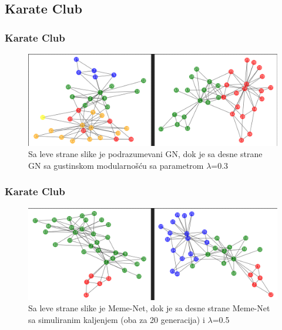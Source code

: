 \documentclass{beamer}
\begin{document}
\subsection{Karate Club}
\begin{frame}\frametitle{Karate Club}
\begin{figure}[h!]
\begin{center}
\includegraphics[scale=0.21]{Karate_GN_basic_vs_density.png}
\end{center}
\caption{Sa leve strane slike je podrazumevani GN, dok je sa desne strane GN sa gustinskom modularnošću sa parametrom $\lambda$=0.3}
\label{fig:GN1}
\end{figure}
\end{frame}

\begin{frame}\frametitle{Karate Club}
\begin{figure}[h!]
\begin{center}
\includegraphics[scale=0.21]{Karate_MA_Local_vs_SAnnealing_20_generations.png}
\end{center}
\caption{Sa leve strane slike je Meme-Net, dok je sa desne strane Meme-Net sa simuliranim kaljenjem (oba za 20 generacija) i $\lambda$=0.5}
\label{fig:Meme1}
\end{figure}
\end{frame}
\end{document}
